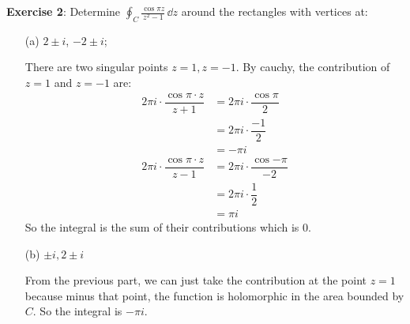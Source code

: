 \documentclass{article}
\begin{document}
\textbf{Exercise 2}: Determine $\oint_{C}^{} \frac{\cos{\pi z}}{z^{2} - 1} \, \dd{z} $ around the rectangles with vertices at:
    \begin{itemize}
        \item [(a)] $2 \pm i$, $-2 \pm i$;
            \begin{answer}
                There are two singular points $z = 1, z = -1$. By cauchy, the contribution of $z = 1$ and $z = -1$ are:
                    \begin{align*}
                        2\pi i \cdot \dfrac{\cos{\pi \cdot z}}{z + 1} &= 2\pi i \cdot \dfrac{\cos{\pi}}{2}   \\
                                                                      &= 2\pi i \cdot \dfrac{-1}{2}          \\
                                                                      &= -\pi i                              \\
                        2\pi i \cdot \dfrac{\cos{\pi \cdot z}}{z - 1} &= 2\pi i \cdot \dfrac{\cos{-\pi}}{-2} \\
                                                                      &= 2\pi i \cdot \dfrac{1}{2}           \\
                                                                      &= \pi i                                 
                    \end{align*}
                So the integral is the sum of their contributions which is $0$.
            \end{answer}

        \item [(b)] $\pm i, 2 \pm i$ 
            \begin{answer}
                From the previous part, we can just take the contribution at the point $z = 1$ because minus that point, the function is holomorphic in the area bounded by $C$. So the integral is $-\pi i$.
            \end{answer}
    \end{itemize}

\newpage
\end{document}
